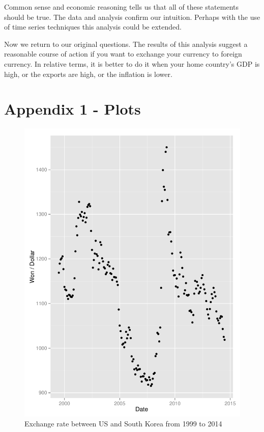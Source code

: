 \documentclass[12pt]{article}
\begin{document}
Common sense and economic reasoning tells us that all of these statements should be
true. The data and analysis confirm our intuition. Perhaps with the use of
time series techniques this analysis could be extended.

Now we return to our original questions. The results of this analysis 
suggest a reasonable course of action if you want to exchange your currency
to foreign currency. In relative terms, it is better to do it when your home country's 
GDP is high, or the exports are high, or the inflation is lower.

\newpage



\section{Appendix 1 - Plots}


\listoffigures

\begin{figure}
  \centering
    \includegraphics{exchange_rate.pdf}
  \caption{Exchange rate between US and South Korea from 1999 to 2014}
  \label{fig:exchange_rate}
\end{figure}
\end{document}
